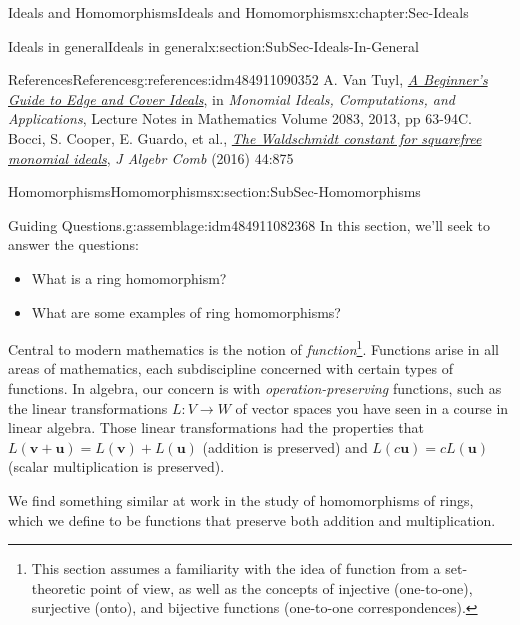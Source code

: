 \documentclass[oneside,10pt,]{book}
\numberwithin{equation}{section}
\begin{document}
\begin{chapterptx}{Ideals and Homomorphisms}{}{Ideals and Homomorphisms}{}{}{x:chapter:Sec-Ideals}
\begin{sectionptx}{Ideals in general}{}{Ideals in general}{}{}{x:section:SubSec-Ideals-In-General}
%
\begin{references-subsection-numberless}{References}{}{References}{}{}{g:references:idm484911090352}
A. Van Tuyl, \emph{\href{http://dx.doi.org/doi:10.1007/978-3-642-38742-5_3}{A Beginner's Guide to Edge and Cover Ideals}}, in \emph{Monomial Ideals, Computations, and Applications}, Lecture Notes in Mathematics Volume 2083, 2013, pp 63-94C. Bocci, S. Cooper, E. Guardo, et al., \emph{\href{https://doi.org/10.1007/s10801-016-0693-7}{The Waldschmidt constant for squarefree monomial ideals}}, \emph{J Algebr Comb} (2016) 44:875\end{references-subsection-numberless}
\end{sectionptx}
%
%
\typeout{************************************************}
\typeout{************************************************}
%
\begin{sectionptx}{Homomorphisms}{}{Homomorphisms}{}{}{x:section:SubSec-Homomorphisms}
\begin{assemblage}{Guiding Questions.}{g:assemblage:idm484911082368}%
In this section, we'll seek to answer the questions: %
\begin{itemize}[label=\textbullet]
\item{}What is a ring homomorphism?%
\item{}What are some examples of ring homomorphisms?%
\end{itemize}
%
\end{assemblage}
\begin{introduction}{}%
Central to modern mathematics is the notion of \emph{function}\footnote{This section assumes a familiarity with the idea of function from a set-theoretic point of view, as well as the concepts of injective (one-to-one), surjective (onto), and bijective functions (one-to-one correspondences).\label{g:fn:idm484911079120}}. Functions arise in all areas of mathematics, each subdiscipline concerned with certain types of functions. In algebra, our concern is with \emph{operation-preserving} functions, such as the linear transformations \(L : V\to W\) of vector spaces you have seen in a course in linear algebra. Those linear transformations had the properties that \(L(\mathbf{v}+\mathbf{u}) = L(\mathbf{v})+L(\mathbf{u})\) (addition is preserved) and \(L(c\mathbf{u}) = c L(\mathbf{u})\) (scalar multiplication is preserved).%
\par
We find something similar at work in the study of homomorphisms of rings, which we define to be functions that preserve both addition and multiplication.%

\end{introduction}
\end{sectionptx}
\end{chapterptx}
\end{document}

